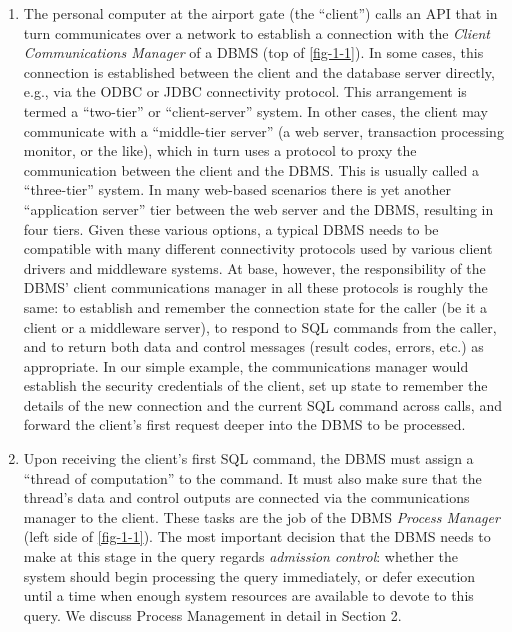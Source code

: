 \documentclass[a4paper,11pt,twoside,openright]{book}
\begin{document}
\begin{enumerate}
\def\labelenumi{\arabic{enumi}.}

\item
  The personal computer at the airport gate (the ``client'') calls an
  API that in turn communicates over a network to establish a connection
  with the \emph{Client Communications Manager} of a DBMS (top of \autoref{fig-1-1}). In some cases, this connection is established between the client
  and the database server directly, e.g., via the ODBC or JDBC
  connectivity protocol. This arrangement is termed a ``two-tier'' or
  ``client-server'' system. In other cases, the client may communicate
  with a ``middle-tier server'' (a web server, transaction processing
  monitor, or the like), which in turn uses a protocol to proxy the
  communication between the client and the DBMS. This is usually called
  a ``three-tier'' system. In many web-based scenarios there is yet
  another ``application server'' tier between the web server and the
  DBMS, resulting in four tiers. Given these various options, a typical
  DBMS needs to be compatible with many different connectivity protocols
  used by various client drivers and middleware systems. At base,
  however, the responsibility of the DBMS' client communications manager
  in all these protocols is roughly the same: to establish and remember
  the connection state for the caller (be it a client or a middleware
  server), to respond to SQL commands from the caller, and to return
  both data and control messages (result codes, errors, etc.) as
  appropriate. In our simple example, the communications manager would
  establish the security credentials of the client, set up state to
  remember the details of the new connection and the current SQL command
  across calls, and forward the client's first request deeper into the
  DBMS to be processed.
\item
  Upon receiving the client's first SQL command, the DBMS must assign a
  ``thread of computation'' to the command. It must also make sure that
  the thread's data and control outputs are connected via the
  communications manager to the client. These tasks are the job of the
  DBMS \emph{Process Manager} (left side of \autoref{fig-1-1}). The most
  important decision that the DBMS needs to make at this stage in the
  query regards \emph{admission control}: whether the system should
  begin processing the query immediately, or defer execution until a
  time when enough system resources are available to devote to this
  query. We discuss Process Management in detail in Section 2.

\end{enumerate}
\end{document}
